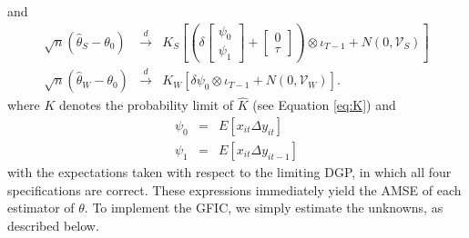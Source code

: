 and
\begin{eqnarray}
\label{eq:dynpan3}
 	\sqrt{n}\left(\widehat{\theta}_{S}-\theta_0\right) &\overset{d}{\rightarrow}&K_S \left[\left(\delta \left[\begin{array}{l} \psi_0\\ \psi_1\end{array} \right] + \left[\begin{array}{c}0\\ \tau \end{array}\right]\right)\otimes \iota_{T-1}+ N\left(0, \mathcal{V}_{S}\right)\right]\\
 	\label{eq:dynpan4}	\sqrt{n}\left(\widehat{\theta}_{W}-\theta_0\right)&\overset{d}{\rightarrow}&K_W  \left[\delta \psi_0 \otimes \iota_{T-1} + N\left(0, \mathcal{V}_W\right) \right].
	\end{eqnarray}
where $K$ denotes the probability limit of $\widehat{K}$ (see Equation \ref{eq:K}) and
	\begin{eqnarray}
		\psi_0 &=&E[x_{it}\Delta y_{it}] \\
		\psi_1 &=&E[x_{it} \Delta y_{it-1}]
	\end{eqnarray}	
with the expectations taken with respect to the limiting DGP, in which all four specifications are correct. 
These expressions immediately yield the AMSE of each estimator of $\theta$. 
To implement the GFIC, we simply estimate the unknowns, as described below.

